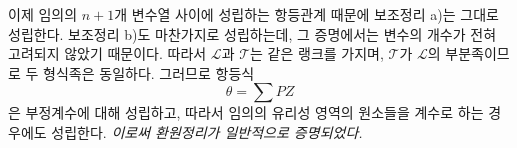 
이제 임의의 $n+1$개 변수열 사이에 성립하는 항등관계 때문에 보조정리 a)는 그대로 성립한다. 보조정리 b)도 마찬가지로 성립하는데, 그 증명에서는 변수의 개수가 전혀 고려되지 않았기 때문이다. 따라서 $\mathcal L$과 $\mathcal T$는 같은 랭크를 가지며, $\mathcal T$가 $\mathcal L$의 부분족이므로 두 형식족은 동일하다. 그러므로 항등식
\[
  \theta=\sum PZ
\]
은 부정계수에 대해 성립하고, 따라서 임의의 유리성 영역의 원소들을 계수로 하는 경우에도 성립한다. \emph{이로써 환원정리가 일반적으로 증명되었다.}
